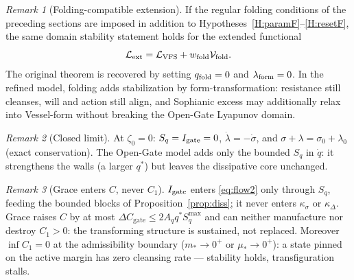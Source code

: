 \documentclass[11pt,a4paper]{article}
\newcommand{\LV}{\mathcal L_{\rm VFS}}
\newcommand{\Igate}{I_{\rm gate}}
\newcommand{\Sq}{S_q}
\theoremstyle{plain}
\theoremstyle{definition}
\theoremstyle{remark}
\newtheorem*{remark}{Remark}
\begin{document}
\begin{remark}[Folding-compatible extension]
If the regular folding conditions of the preceding sections are imposed in
addition to Hypotheses~\ref{H:paramF}--\ref{H:resetF}, the same domain stability
statement holds for the extended functional
\begin{equation}
  \mathcal L_{\rm ext}=\LV+w_{\rm fold}\mathcal V_{\rm fold}.
\end{equation}
The original theorem is recovered by setting $q_{\rm fold}=0$ and
$\lambda_{\rm form}=0$. In the refined model, folding adds stabilization by
form-transformation: resistance still cleanses, will and action still align, and
Sophianic excess may additionally relax into Vessel-form without breaking the
Open-Gate Lyapunov domain.
\end{remark}


\begin{remark}[Closed limit]
At $\zeta_0=0$: $\Sq=\Igate=0$, $\dot\lambda=-\dot\sigma$, and
$\sigma+\lambda=\sigma_0+\lambda_0$ (exact conservation). The Open-Gate model adds
only the bounded $\Sq$ in $\dot q$: it strengthens the walls (a larger $q^*$) but
leaves the dissipative core unchanged.
\end{remark}

\begin{remark}[Grace enters $C$, never $C_1$]
$\Igate$ enters \eqref{eq:flow2} only through $\Sq$, feeding the bounded blocks of
Proposition~\ref{prop:diss}; it never enters $\kappa_\sigma$ or $\kappa_\Delta$.
Grace raises $C$ by at most $\Delta C_{\mathrm{gate}}\le2A_qq^*\Sq^{\max}$ and can
neither manufacture nor destroy $C_1>0$: the transforming structure is sustained,
not replaced. Moreover $\inf C_1=0$ at the admissibility boundary
($m_*\to0^+$ or $\mu_*\to0^+$): a state pinned on the active margin has zero
cleansing rate --- stability holds, transfiguration stalls.
\end{remark}
\end{document}
